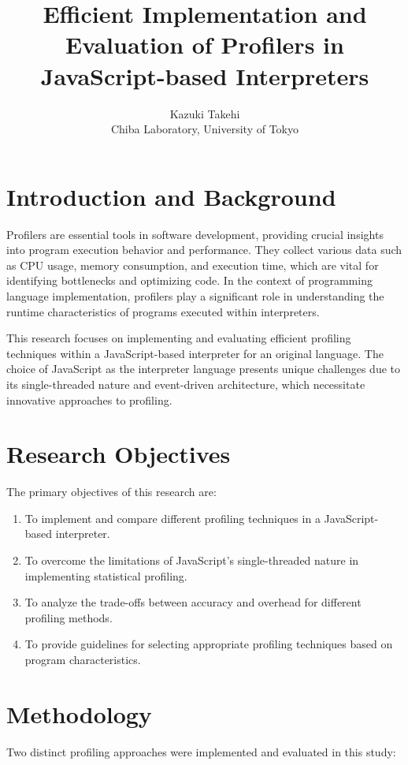 \documentclass[a4paper,10pt]{article}
\title{Efficient Implementation and Evaluation of Profilers in JavaScript-based Interpreters}
\author{Kazuki Takehi \\ Chiba Laboratory, University of Tokyo}
\date{}
\begin{document}
\maketitle

\section*{Introduction and Background}
Profilers are essential tools in software development, providing crucial insights into program execution behavior and performance. They collect various data such as CPU usage, memory consumption, and execution time, which are vital for identifying bottlenecks and optimizing code. In the context of programming language implementation, profilers play a significant role in understanding the runtime characteristics of programs executed within interpreters.

This research focuses on implementing and evaluating efficient profiling techniques within a JavaScript-based interpreter for an original language. The choice of JavaScript as the interpreter language presents unique challenges due to its single-threaded nature and event-driven architecture, which necessitate innovative approaches to profiling.

\section*{Research Objectives}
The primary objectives of this research are:
\begin{enumerate}
    \item To implement and compare different profiling techniques in a JavaScript-based interpreter.
    \item To overcome the limitations of JavaScript's single-threaded nature in implementing statistical profiling.
    \item To analyze the trade-offs between accuracy and overhead for different profiling methods.
    \item To provide guidelines for selecting appropriate profiling techniques based on program characteristics.
\end{enumerate}

\section*{Methodology}
Two distinct profiling approaches were implemented and evaluated in this study:
\end{document}
